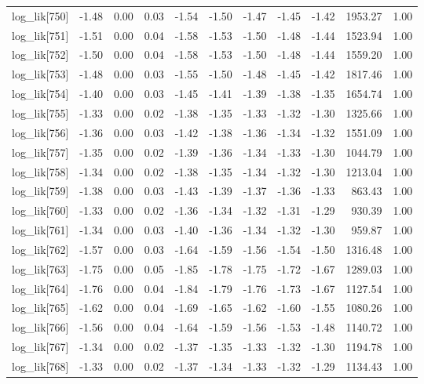 \begin{table}[ht]
\begin{tabular}{rrrrrrrrrrr}
  log\_lik[750] & -1.48 & 0.00 & 0.03 & -1.54 & -1.50 & -1.47 & -1.45 & -1.42 & 1953.27 & 1.00 \\ 
  log\_lik[751] & -1.51 & 0.00 & 0.04 & -1.58 & -1.53 & -1.50 & -1.48 & -1.44 & 1523.94 & 1.00 \\ 
  log\_lik[752] & -1.50 & 0.00 & 0.04 & -1.58 & -1.53 & -1.50 & -1.48 & -1.44 & 1559.20 & 1.00 \\ 
  log\_lik[753] & -1.48 & 0.00 & 0.03 & -1.55 & -1.50 & -1.48 & -1.45 & -1.42 & 1817.46 & 1.00 \\ 
  log\_lik[754] & -1.40 & 0.00 & 0.03 & -1.45 & -1.41 & -1.39 & -1.38 & -1.35 & 1654.74 & 1.00 \\ 
  log\_lik[755] & -1.33 & 0.00 & 0.02 & -1.38 & -1.35 & -1.33 & -1.32 & -1.30 & 1325.66 & 1.00 \\ 
  log\_lik[756] & -1.36 & 0.00 & 0.03 & -1.42 & -1.38 & -1.36 & -1.34 & -1.32 & 1551.09 & 1.00 \\ 
  log\_lik[757] & -1.35 & 0.00 & 0.02 & -1.39 & -1.36 & -1.34 & -1.33 & -1.30 & 1044.79 & 1.00 \\ 
  log\_lik[758] & -1.34 & 0.00 & 0.02 & -1.38 & -1.35 & -1.34 & -1.32 & -1.30 & 1213.04 & 1.00 \\ 
  log\_lik[759] & -1.38 & 0.00 & 0.03 & -1.43 & -1.39 & -1.37 & -1.36 & -1.33 & 863.43 & 1.00 \\ 
  log\_lik[760] & -1.33 & 0.00 & 0.02 & -1.36 & -1.34 & -1.32 & -1.31 & -1.29 & 930.39 & 1.00 \\ 
  log\_lik[761] & -1.34 & 0.00 & 0.03 & -1.40 & -1.36 & -1.34 & -1.32 & -1.30 & 959.87 & 1.00 \\ 
  log\_lik[762] & -1.57 & 0.00 & 0.03 & -1.64 & -1.59 & -1.56 & -1.54 & -1.50 & 1316.48 & 1.00 \\ 
  log\_lik[763] & -1.75 & 0.00 & 0.05 & -1.85 & -1.78 & -1.75 & -1.72 & -1.67 & 1289.03 & 1.00 \\ 
  log\_lik[764] & -1.76 & 0.00 & 0.04 & -1.84 & -1.79 & -1.76 & -1.73 & -1.67 & 1127.54 & 1.00 \\ 
  log\_lik[765] & -1.62 & 0.00 & 0.04 & -1.69 & -1.65 & -1.62 & -1.60 & -1.55 & 1080.26 & 1.00 \\ 
  log\_lik[766] & -1.56 & 0.00 & 0.04 & -1.64 & -1.59 & -1.56 & -1.53 & -1.48 & 1140.72 & 1.00 \\ 
  log\_lik[767] & -1.34 & 0.00 & 0.02 & -1.37 & -1.35 & -1.33 & -1.32 & -1.30 & 1194.78 & 1.00 \\ 
  log\_lik[768] & -1.33 & 0.00 & 0.02 & -1.37 & -1.34 & -1.33 & -1.32 & -1.29 & 1134.43 & 1.00 \\ 

\end{tabular}
\end{table}
